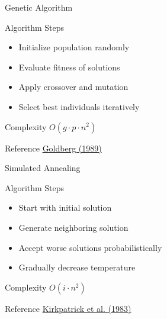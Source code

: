 \documentclass[aspectratio=169]{beamer}
\begin{document}
\begin{frame}{Genetic Algorithm}

\begin{block}{Algorithm Steps}
\begin{itemize}
\item Initialize population randomly
\item Evaluate fitness of solutions
\item Apply crossover and mutation
\item Select best individuals iteratively
\end{itemize}
\end{block}

\begin{exampleblock}{Complexity}
$O(g \cdot p \cdot n^2)$
\end{exampleblock}

\begin{alertblock}{Reference}
\href{https://mitpress.mit.edu/9780262031417/genetic-algorithms-in-search-optimization-and-machine-learning/}{Goldberg (1989)}
\end{alertblock}

\end{frame}

\begin{frame}{Simulated Annealing}

\begin{block}{Algorithm Steps}
\begin{itemize}
\item Start with initial solution
\item Generate neighboring solution
\item Accept worse solutions probabilistically
\item Gradually decrease temperature
\end{itemize}
\end{block}

\begin{exampleblock}{Complexity}
$O(i \cdot n^2)$
\end{exampleblock}

\begin{alertblock}{Reference}
\href{https://www.science.org/doi/10.1126/science.220.4598.671}{Kirkpatrick et al. (1983)}
\end{alertblock}

\end{frame}
\end{document}

